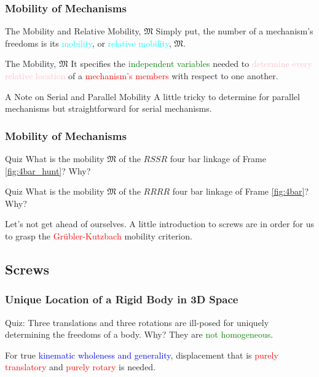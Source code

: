 \begin{frame}
	\frametitle{Mobility of Mechanisms}
	\begin{block}{The Mobility and Relative Mobility, $\mathfrak{M}$}
		Simply put, the number of a mechanism's freedoms is its \textcolor{cyan}{mobility}, or \textcolor{cyan}{relative mobility},  $\mathfrak{M}$.  
	\end{block}
	\begin{block}{The Mobility, $\mathfrak{M}$}
		It specifies the \textcolor{green}{independent variables} needed to \textcolor{pink}{determine every relative location} of a \textcolor{red}{mechanism's members}  with respect to one another.
	\end{block}
	\begin{block}{A Note on Serial and Parallel Mobility}
		A little tricky to determine for parallel mechanisms but straightforward for serial mechanisms.
	\end{block}
\end{frame}

\begin{frame}
	\frametitle{Mobility of Mechanisms}
	\begin{block}{Quiz}
		What is the mobility $\mathfrak{M}$ of the $RSSR$ four bar linkage of Frame \ref{fig:4bar_hunt}? Why?
	\end{block}
	\begin{block}{Quiz}
		What is the mobility $\mathfrak{M}$ of the $RRRR$ four bar linkage of Frame \ref{fig:4bar}? Why?
	\end{block}
	\begin{definition}
		Let's not get ahead of ourselves. A little introduction to screws are in order for us to grasp the \textcolor{red}{Gr{\"u}bler-Kutzbach} mobility criterion.
	\end{definition}
\end{frame}


\subsection{Screws}
\begin{frame}
	\frametitle{Unique Location of a Rigid Body in 3D Space}
	\begin{tcolorbox}[top=0mm, title=Inhomogeneity of Displacements and Angles]
		Quiz: Three translations and three rotations are ill-posed for uniquely determining the freedoms of a body. Why?
		\tcblower
		They are \textcolor{green}{not homogeneous}. 
		\begin{description}
			\item For true \textcolor{blue}{kinematic wholeness and generality}, displacement that is \textcolor{red}{purely translatory} and \textcolor{red}{purely rotary} is needed.
		\end{description}
	\end{tcolorbox}
\end{frame}

